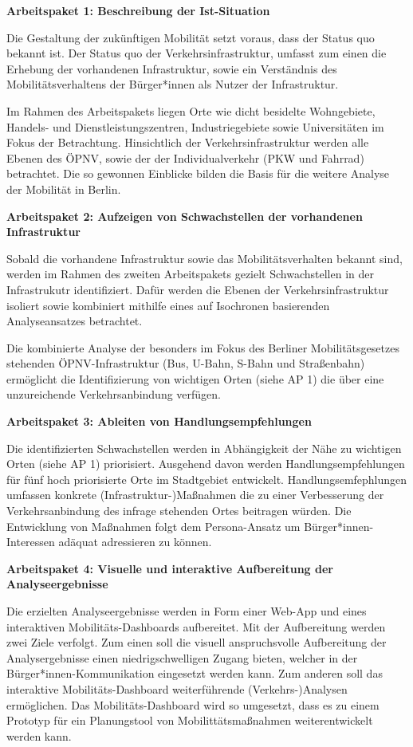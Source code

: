 \textbf{Arbeitspaket 1: Beschreibung der Ist-Situation}

Die Gestaltung der zukünftigen Mobilität setzt voraus, dass der Status quo bekannt ist. Der Status quo der Verkehrsinfrastruktur, umfasst zum einen die Erhebung der vorhandenen Infrastruktur, sowie ein Verständnis des Mobilitätsverhaltens der Bürger*innen als Nutzer der Infrastruktur.

Im Rahmen des Arbeitspakets liegen Orte wie dicht besidelte Wohngebiete, Handels- und Dienstleistungszentren, Industriegebiete sowie Universitäten im Fokus der Betrachtung. Hinsichtlich der Verkehrsinfrastruktur werden alle Ebenen des ÖPNV, sowie der der Individualverkehr (PKW und Fahrrad) betrachtet. Die so gewonnen Einblicke bilden die Basis für die weitere Analyse der Mobilität in Berlin.

\textbf{Arbeitspaket 2: Aufzeigen von Schwachstellen der vorhandenen Infrastruktur}

Sobald die vorhandene Infrastruktur sowie das Mobilitätsverhalten bekannt sind, werden im Rahmen des zweiten Arbeitspakets gezielt Schwachstellen in der Infrastrukutr identifiziert. Dafür werden die  Ebenen der Verkehrsinfrastruktur isoliert sowie kombiniert mithilfe eines auf Isochronen basierenden Analyseansatzes betrachtet.

Die kombinierte Analyse der besonders im Fokus des Berliner Mobilitätsgesetzes stehenden ÖPNV-Infrastruktur (Bus, U-Bahn, S-Bahn und Straßenbahn) ermöglicht die Identifizierung von wichtigen Orten (siehe AP 1) die über eine unzureichende Verkehrsanbindung verfügen.

\textbf{Arbeitspaket 3: Ableiten von Handlungsempfehlungen}

Die identifizierten Schwachstellen werden in Abhängigkeit der Nähe zu wichtigen Orten (siehe AP 1) priorisiert. Ausgehend davon werden Handlungsempfehlungen für fünf hoch priorisierte Orte im Stadtgebiet entwickelt. Handlungsemfephlungen umfassen konkrete (Infrastruktur-)Maßnahmen die zu einer Verbesserung der Verkehrsanbindung des infrage stehenden Ortes beitragen würden. Die Entwicklung von Maßnahmen folgt dem Persona-Ansatz um Bürger*innen-Interessen adäquat adressieren zu können.

\textbf{Arbeitspaket 4: Visuelle und interaktive Aufbereitung der Analyseergebnisse}

Die erzielten Analyseergebnisse werden in Form einer Web-App und eines interaktiven Mobilitäts-Dashboards aufbereitet. Mit der Aufbereitung werden zwei Ziele verfolgt. Zum einen soll die visuell anspruchsvolle Aufbereitung der Analysergebnisse einen niedrigschwelligen Zugang bieten, welcher in der Bürger*innen-Kommunikation eingesetzt werden kann. Zum anderen soll das interaktive Mobilitäts-Dashboard weiterführende (Verkehrs-)Analysen ermöglichen. Das Mobilitäts-Dashboard wird so umgesetzt, dass es zu einem Prototyp für ein Planungstool von Mobilittätsmaßnahmen weiterentwickelt werden kann.

